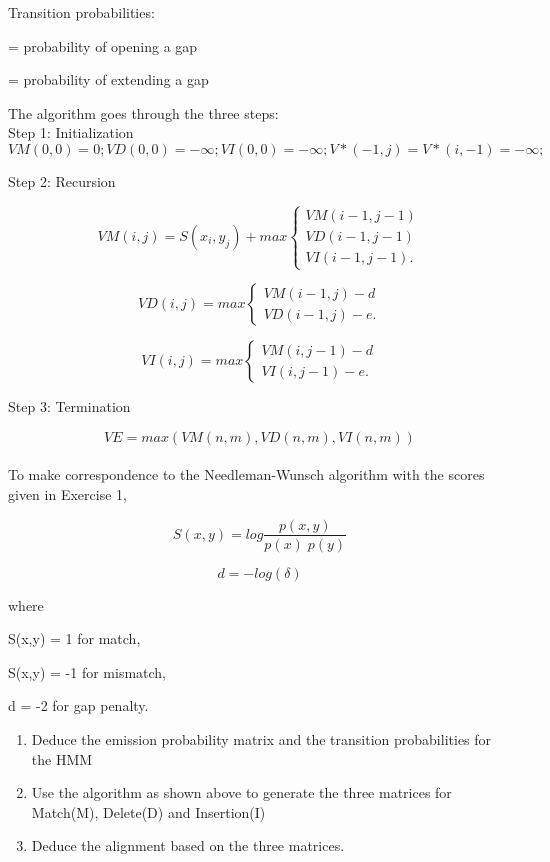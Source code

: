 \documentclass[a4paper,11pt]{article}
\DeclareRobustCommand{\greektext}{%
  \fontencoding{LGR}\selectfont\def\encodingdefault{LGR}}
\DeclareRobustCommand{\textgreek}[1]{\leavevmode{\greektext #1}}
\begin{document}
Transition probabilities:

\textgreek{d} = probability of opening a gap

\textgreek{e} = probability of extending a gap

\vspace{0.5cm}
The algorithm goes through the three steps:\\


Step 1: Initialization
\[
VM(0,0)=0; VD(0,0)=-\infty ; VI(0,0)=-\infty;
V*(-1,j)=V*(i,-1)=-\infty;\]
\newpage


Step 2: Recursion

\[ VM(i,j) =S(x_{i},y_{j})+max \left\{ \begin{array}{ll}
	 VM(i-1,j-1)\\
         VD(i-1,j-1) \\
         VI(i-1,j-1)  .\end{array} \right. \] 

\[ VD(i,j) =max \left\{ \begin{array}{ll}
         VM(i-1,j)-d \\
         VD(i-1,j)-e  .\end{array} \right. \] 

\[ VI(i,j) =max \left\{ \begin{array}{ll}
         VM(i,j-1)-d \\
         VI(i,j-1)-e  .\end{array} \right. \]  



Step 3: Termination

\[ VE=max(VM(n,m),VD(n,m),VI(n,m))\]\\

To make correspondence to the Needleman-Wunsch algorithm with the scores given in Exercise 1,

\[
S(x,y)=log\frac{p(x,y)}{p(x)\; p(y)}\]

\[
d=-log(\delta)\]

where 

S(x,y) = 1 for match, 

S(x,y) = -1 for mismatch,

d = -2 for gap penalty.

\begin{enumerate}
\item Deduce the emission probability matrix and the transition probabilities for the HMM
\item Use the algorithm as shown above to generate the three matrices for Match(M), Delete(D) and Insertion(I)
\item Deduce the alignment based on the three matrices.
\end{enumerate}
\end{document}
